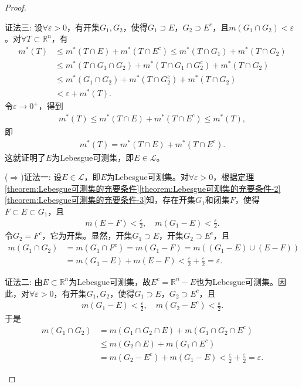 \documentclass[../../main.tex]{subfiles}%
\begin{document}
\begin{proof}
\begin{enumerate}
{\color{blue}证法三:} 设$\forall\varepsilon>0$，有开集$G_1,G_2$，使得$G_1\supset E$，$G_2\supset E^c$，且$m(G_1\cap G_2)<\varepsilon$。对$\forall T\subset\mathbb{R}^n$，有
\begin{align*}
m^*(T) &\leqslant m^*(T\cap E)+m^*(T\cap E^c)
\leqslant m^*(T\cap G_1)+m^*(T\cap G_2) \\
&\leqslant m^*(T\cap G_1\cap G_2)+m^*(T\cap G_1\cap G_2^c)+m^*(T\cap G_2) \\
&\leqslant m^*(G_1\cap G_2)+m^*(T\cap G_2^c)+m^*(T\cap G_2) \\
&< \varepsilon+m^*(T).
\end{align*}
令$\varepsilon\to 0^+$，得到
\begin{align*}
m^*(T) \leqslant m^*(T\cap E)+m^*(T\cap E^c) \leqslant m^*(T),
\end{align*}
即
\begin{align*}
m^*(T) = m^*(T\cap E)+m^*(T\cap E^c).
\end{align*}
这就证明了$E$为Lebesgue可测集，即$E\in\mathscr{L}$。

($\Rightarrow$){\color{blue}证法一:} 设$E\in\mathscr{L}$，即$E$为Lebesgue可测集。对$\forall\varepsilon>0$，根据\hyperref[theorem:Lebesgue可测集的充要条件]{定理\ref{theorem:Lebesgue可测集的充要条件}\ref{theorem:Lebesgue可测集的充要条件-2}\ref{theorem:Lebesgue可测集的充要条件-3}}知，存在开集$G_1$和闭集$F$，使得$F\subset E\subset G_1$，且
\begin{align*}
m(E-F) < \frac{\varepsilon}{2},\quad m(G_1-E) < \frac{\varepsilon}{2}.
\end{align*}
令$G_2=F^c$，它为开集。显然，开集$G_1\supset E$，开集$G_2\supset E^c$，且
\begin{align*}
m(G_1\cap G_2) &= m(G_1\cap F^c) = m(G_1-F) = m((G_1-E)\cup(E-F)) \\
&= m(G_1-E)+m(E-F) < \frac{\varepsilon}{2}+\frac{\varepsilon}{2} = \varepsilon.
\end{align*}

{\color{blue}证法二:} 由$E\subset\mathbb{R}^n$为Lebesgue可测集，故$E^c=\mathbb{R}^n-E$也为Lebesgue可测集。因此，对$\forall\varepsilon>0$，有开集$G_1,G_2$，使得$G_1\supset E$，$G_2\supset E^c$，且
\begin{align*}
m(G_1-E) < \frac{\varepsilon}{2},\quad m(G_2-E^c) < \frac{\varepsilon}{2}.
\end{align*}
于是
\begin{align*}
m(G_1\cap G_2) &= m(G_1\cap G_2\cap E)+m(G_1\cap G_2\cap E^c) \\
&\leqslant m(G_2\cap E)+m(G_1\cap E^c) \\
&= m(G_2-E^c)+m(G_1-E) < \frac{\varepsilon}{2}+\frac{\varepsilon}{2} = \varepsilon.
\end{align*}
\end{enumerate}

\end{proof}
\end{document}
